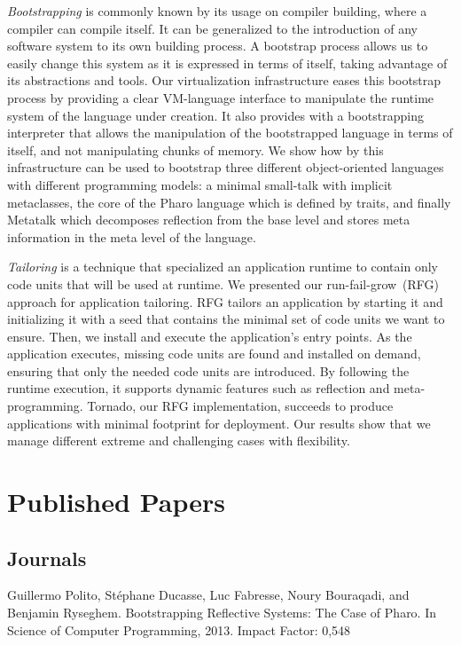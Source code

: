 \emph{Bootstrapping} is commonly known by its usage on compiler building, where a compiler can compile itself.
It can be generalized to the introduction of any software system to its own building process.
A bootstrap process allows us to easily change this system as it is expressed in terms of itself, taking advantage of its abstractions and tools.
Our virtualization infrastructure eases this bootstrap process by providing a clear VM-language interface to manipulate the runtime system of the language under creation. It also provides with a bootstrapping interpreter that allows the manipulation of the bootstrapped language in terms of itself, and not manipulating chunks of memory.
We show how by this infrastructure can be used to bootstrap three different object-oriented languages with different programming models: a minimal small-talk with implicit metaclasses, the core of the Pharo language which is defined by traits, and finally Metatalk which decomposes reflection from the base level and stores meta information in the meta level of the language.

\emph{Tailoring} is a technique that specialized an application runtime to contain only code units that will be used at runtime. We presented our run-fail-grow~(RFG) approach for application tailoring. RFG tailors an application by starting it and initializing it with a seed that contains the minimal set of code units we want to ensure. Then, we install and execute the application's entry points. As the application executes, missing code units are found and installed on demand, ensuring that only the needed code units are introduced. By following the runtime execution, it supports dynamic features such as reflection and meta-programming. Tornado, our RFG implementation, succeeds to produce applications with minimal footprint for deployment. Our results show that we manage different extreme and challenging cases with flexibility.

\section{Published Papers}

\subsection{Journals}

Guillermo Polito, Stéphane Ducasse, Luc Fabresse, Noury Bouraqadi, and Benjamin Ryseghem. Bootstrapping Reflective Systems: The Case of Pharo. In Science of Computer Programming, 2013. Impact Factor: 0,548\newline



